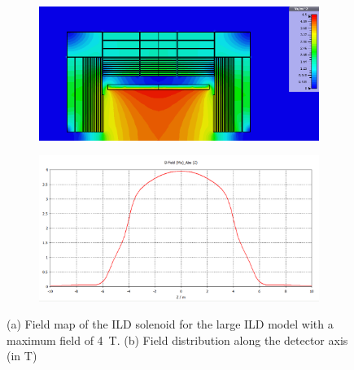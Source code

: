 \begin{figure}[t]
\begin{center}
\begin{subfigure}{0.75\hsize} \includegraphics[width=\textwidth]{Integration/fig/field_nominal_4.png}
\caption{ \label{ild:fig:magnet_nominal_map}}
 \end{subfigure}
\hspace{0.03\textwidth}
\begin{subfigure}{0.75\hsize} \includegraphics[width=\textwidth]{Integration/fig/field_nominal_4_plot.png}
\caption{  \label{ild:fig:magnet_nominal_field}}
 \end{subfigure}
\end{center}
\caption{(a) Field map of the ILD solenoid for the large ILD model with a maximum field of 4~T. (b) Field distribution along the detector axis (in T)~\cite{ild:bib:Magnet_Simulations}}
\label{ILD:fig:magnet_nominal}
\end{figure}

